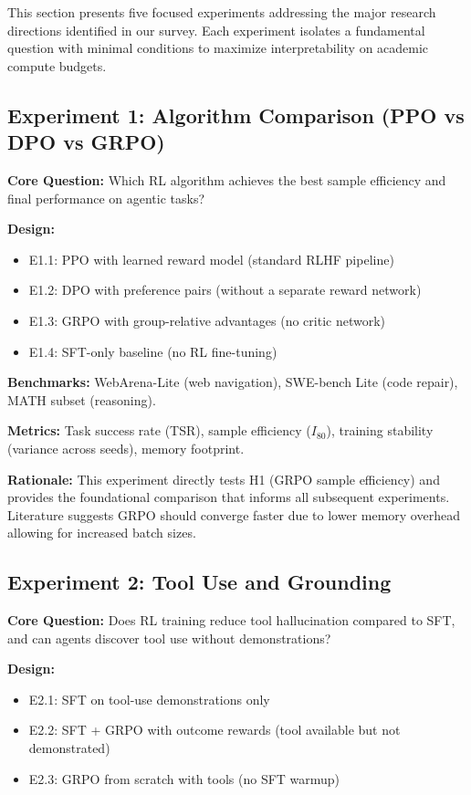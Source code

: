 \documentclass[12pt,a4paper]{report}
\theoremstyle{definition}
\begin{document}
This section presents five focused experiments addressing the major research directions identified in our survey. Each experiment isolates a fundamental question with minimal conditions to maximize interpretability on academic compute budgets.

\subsection{Experiment 1: Algorithm Comparison (PPO vs DPO vs GRPO)}
\textbf{Core Question:} Which RL algorithm achieves the best sample efficiency and final performance on agentic tasks?

\textbf{Design:}
\begin{itemize}
    \item E1.1: PPO with learned reward model (standard RLHF pipeline)
    \item E1.2: DPO with preference pairs (without a separate reward network)
    \item E1.3: GRPO with group-relative advantages (no critic network)
    \item E1.4: SFT-only baseline (no RL fine-tuning)
\end{itemize}

\textbf{Benchmarks:} WebArena-Lite (web navigation), SWE-bench Lite (code repair), MATH subset (reasoning).

\textbf{Metrics:} Task success rate (TSR), sample efficiency ($I_{80}$), training stability (variance across seeds), memory footprint.

\textbf{Rationale:} This experiment directly tests H1 (GRPO sample efficiency) and provides the foundational comparison that informs all subsequent experiments. Literature suggests GRPO should converge faster due to lower memory overhead allowing for increased batch sizes.

\subsection{Experiment 2: Tool Use and Grounding}
\textbf{Core Question:} Does RL training reduce tool hallucination compared to SFT, and can agents discover tool use without demonstrations?

\textbf{Design:}
\begin{itemize}
    \item E2.1: SFT on tool-use demonstrations only
    \item E2.2: SFT + GRPO with outcome rewards (tool available but not demonstrated)
    \item E2.3: GRPO from scratch with tools (no SFT warmup)
\end{itemize}
\end{document}
